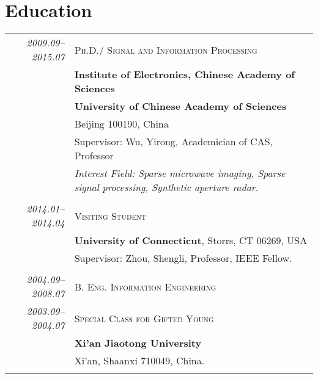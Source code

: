 \documentclass[paper=a4,fontsize=11pt]{scrartcl}
\begin{document}
\section*{Education}

\begin{tabular}{r|p{12cm}}	
	\emph{2009.09--2015.07} & \textsc{Ph.D.}/ \textsc{Signal and Information Processing} \\
	& \normalsize\textbf{Institute of Electronics, Chinese Academy of Sciences} \\
	& \normalsize\textbf{University of Chinese Academy of Sciences}\\
	& Beijing 100190, China\\
	& Supervisor: Wu, Yirong, Academician of CAS, Professor \\
	& \emph{Interest Field: Sparse microwave imaging, Sparse signal processing, Synthetic aperture radar.} \\

	\multicolumn{2}{c}{} \\
		
	
	\emph{2014.01--2014.04} & \textsc{Visiting Student}\\
	& \normalsize\textbf{University of Connecticut}, Storrs, CT 06269, USA\\
	& Supervisor: Zhou, Shengli, Professor, IEEE Fellow. \\
	\multicolumn{2}{c}{} \\


	\emph{2004.09--2008.07} & \textsc{B. Eng.} \textsc{Information Engineering} \\
		\emph{2003.09--2004.07} & \textsc{Special Class for Gifted Young} \\
	& \normalsize\textbf{Xi'an Jiaotong University} \\
	& Xi'an, Shaanxi 710049, China.\\
	\multicolumn{2}{c}{}
%	
%	




\end{tabular}
\end{document}
